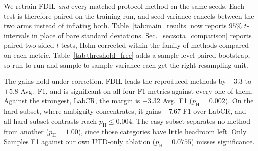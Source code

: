 {

We retrain FDIL \emph{and} every matched-protocol method on the same  seeds. Each test is therefore paired on the training run, and seed variance cancels between the two arms instead of inflating both. Table~\ref{tab:main_results} now reports $95\%$ $t$-intervals in place of bare standard deviations. Sec.~\ref{sec:sota_comparison} reports paired two-sided $t$-tests, Holm-corrected within the family of methods compared on each metric. Table~\ref{tab:threshold_free} adds a sample-level paired bootstrap, so run-to-run and sample-to-sample variance each get the right resampling unit.

The gains hold under correction. FDIL leads the reproduced methods by $+3.3$ to $+5.8$ Avg.\ F1, and is significant on all four F1 metrics against every one of them. Against the strongest, LabCR, the margin is $+3.32$ Avg.\ F1 ($p_{\mathrm H}=0.002$). On the hard subset, where ambiguity concentrates, it gains $+7.67$ F1 over LabCR, and all hard-subset contrasts reach $p_{\mathrm H}\le0.004$. The easy subset separates no method from another ($p_{\mathrm H}=1.00$), since those categories have little headroom left. Only Samples F1 against our own UTD-only ablation ($p_{\mathrm H}=0.0755$) misses significance.
}
\showQuadrants
\showSignificance

